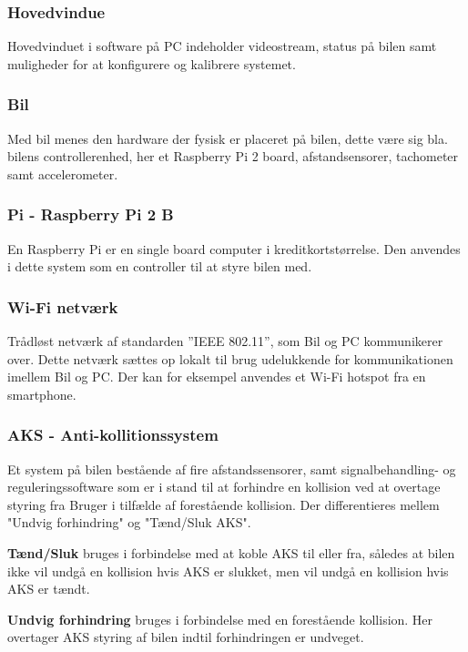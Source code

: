 \subsubsection{Hovedvindue}
Hovedvinduet i software på PC indeholder videostream, status på bilen samt muligheder for at konfigurere og kalibrere systemet.

\subsubsection{Bil}
Med bil menes den hardware der fysisk er placeret på bilen, dette være sig bla. bilens controllerenhed, her et Raspberry Pi 2 board, afstandsensorer, tachometer samt accelerometer.

\clearpage %

\subsubsection{Pi - Raspberry Pi 2 B}
En Raspberry Pi er en single board computer i kreditkortstørrelse. Den anvendes i dette system som en controller til at styre bilen med.

\subsubsection{Wi-Fi netværk}
Trådløst netværk af standarden ''IEEE 802.11'', som Bil og PC kommunikerer over. Dette netværk sættes op lokalt til brug udelukkende for kommunikationen imellem Bil og PC. Der kan for eksempel anvendes et Wi-Fi hotspot fra en smartphone.

\subsubsection{AKS - Anti-kollitionssystem}
Et system på bilen bestående af fire afstandssensorer, samt signalbehandling- og reguleringssoftware som er i stand til at forhindre en kollision ved at overtage styring fra Bruger i tilfælde af forestående kollision. Der differentieres mellem "Undvig forhindring" og "Tænd/Sluk AKS".

\begin{packed_item}
	\item \textbf{Tænd/Sluk }bruges i forbindelse med at koble AKS til eller fra, således at bilen ikke vil undgå en kollision hvis AKS er slukket, men vil undgå en kollision hvis AKS er tændt. 
	\item \textbf{Undvig forhindring} bruges i forbindelse med en forestående kollision. Her overtager AKS styring af bilen indtil forhindringen er undveget. 
\end{packed_item}

